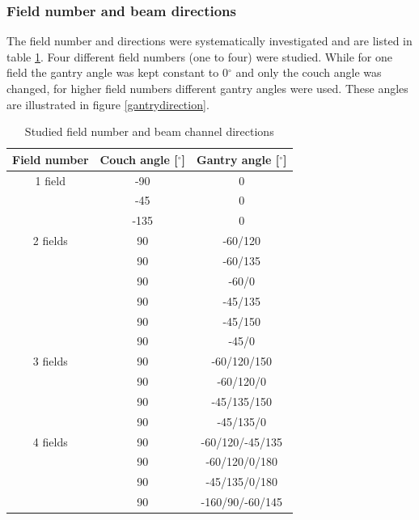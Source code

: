 
\subsubsection{Field number and beam directions}

The field number and directions were systematically investigated and are listed in table \ref{tab:fields}. 
Four different field numbers 
(one to four) were studied. While for one field the gantry angle was kept constant to 0$^{\circ}$ and only the couch angle was 
changed, for higher field numbers different gantry angles were used. These angles are illustrated in figure \ref{gantrydirection}. 


\begin{table}[H]
  \centering
     \small
  \caption{Studied field number and beam channel directions}
  \begin{tabular}{|c|c|c|}
    \hline\hline
    Field number & Couch angle [$^{\circ}$] & Gantry angle [$^{\circ}$]\\
    \hline 
1 field & -90 & 0 \\
& -45 & 0 \\
& -135 & 0 \\
\hline
2 fields & 90 & -60/120 \\
& 90 & -60/135 \\
& 90 & -60/0 \\
& 90 & -45/135 \\
& 90 & -45/150 \\
& 90 & -45/0 \\
\hline
3 fields & 90 & -60/120/150 \\
& 90 & -60/120/0 \\
& 90 & -45/135/150 \\
& 90 & -45/135/0 \\
\hline
4 fields & 90 & -60/120/-45/135 \\
& 90 & -60/120/0/180 \\
& 90 & -45/135/0/180 \\
& 90 & -160/90/-60/145 \\
    \hline\hline
  \end{tabular}
  \label{tab:fields}
\end{table}

\vspace*{-0.6cm}

